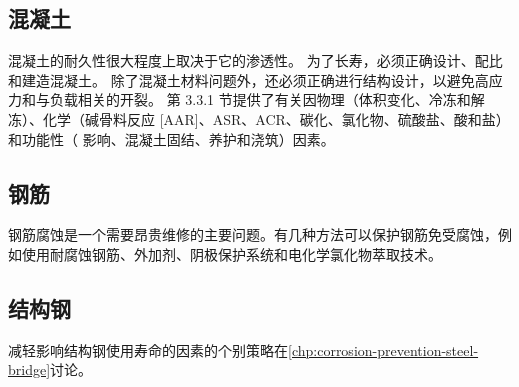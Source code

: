 \subsection{混凝土}
混凝土的耐久性很大程度上取决于它的渗透性。 为了长寿，必须正确设计、配比和建造混凝土。 除了混凝土材料问题外，还必须正确进行结构设计，以避免高应力和与负载相关的开裂。 第 3.3.1 节提供了有关因物理（体积变化、冷冻和解冻）、化学（碱骨料反应 [AAR]、ASR、ACR、碳化、氯化物、硫酸盐、酸和盐）和功能性（ 影响、混凝土固结、养护和浇筑）因素。

\subsection{钢筋}
钢筋腐蚀是一个需要昂贵维修的主要问题。有几种方法可以保护钢筋免受腐蚀，例如使用耐腐蚀钢筋、外加剂、阴极保护系统和电化学氯化物萃取技术。

\subsection{结构钢}
减轻影响结构钢使用寿命的因素的个别策略在\cref{chp:corrosion-prevention-steel-bridge}讨论。

